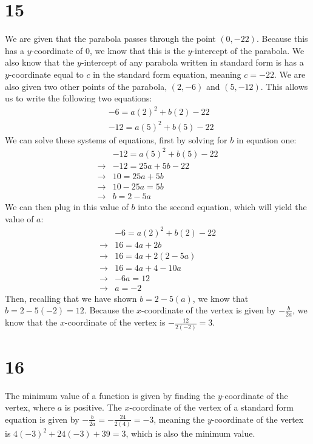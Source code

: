 \documentclass{article}
\theoremstyle{definition}
\begin{document}
\section*{15}
We are given that the parabola passes through the point $(0,-22)$. Because this has a $y$-coordinate of $0$, we know that this is the $y$-intercept 
of the parabola. We also know that the $y$-intercept of any parabola written in standard form is has a $y$-coordinate equal to $c$ in the standard 
form equation, meaning $c=-22$. We are also given two other points of the parabola, $(2,-6)$ and $(5,-12)$. This allows us to write the following 
two equations:
\[
\begin{array}{rl}
            & -6=a(2)^2+b(2)-22 \\
	    & -12=a(5)^2+b(5)-22
\end{array}
\] 
We can solve these systems of equations, first by solving for $b$ in equation one:
\[
\begin{array}{rl}
            & -12=a(5)^2+b(5)-22 \\
\rightarrow & -12=25a+5b-22 \\
\rightarrow & 10=25a+5b \\
\rightarrow & 10-25a=5b \\
\rightarrow & b=2-5a
\end{array}
\] 
We can then plug in this value of $b$ into the second equation, which will yield the value of $a$:
\[
\begin{array}{rl}
            & -6=a(2)^2+b(2)-22 \\
\rightarrow & 16=4a+2b \\
\rightarrow & 16=4a+2(2-5a) \\
\rightarrow & 16=4a+4-10a \\
\rightarrow & -6a=12 \\
\rightarrow & a=-2
\end{array}
\] 
Then, recalling that we have shown $b=2-5(a)$, we know that $b=2-5(-2)=12$. Because the $x$-coordinate of the vertex is given by $-\frac{b}{2a}$, we know 
that the $x$-coordinate of the vertex is $-\frac{12}{2(-2)}=3$.
\section*{16}
The minimum value of a function is given by finding the $y$-coordinate of the vertex, where $a$ is positive. The $x$-coordinate of the vertex of a standard 
form equation is given by $-\frac{b}{2a}=-\frac{24}{2(4)}=-3$, meaning the $y$-coordinate of the vertex is $4(-3)^2+24(-3)+39=3$, which is also 
the minimum value.
\end{document}
